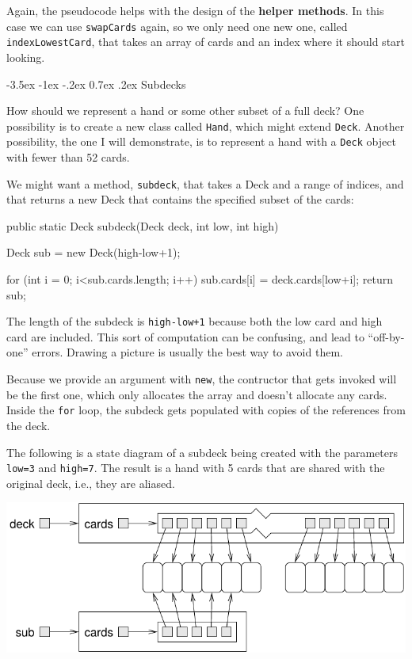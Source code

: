\documentclass[12pt]{book}
\makeatletter
\renewcommand{\section}{\@startsection {section}{1}{\z@}%
    {-3.5ex \@plus -1ex \@minus -.2ex}%
    {0.7ex \@plus.2ex}%
    {\normalfont\Large\bfseries}}
\theoremstyle{exercise}
\newcommand{\java}[1]{\lstinline{#1}} %
\makeatother
\begin{document}
Again, the pseudocode helps with the design of the {\bf helper methods}.
In this case we can use \java{swapCards} again, so we only need one new one, called \java{indexLowestCard}, that takes an array of cards and an index where it should start looking.



\section{Subdecks}

How should we represent a hand or some other subset of a full deck?
One possibility is to create a new class called \java{Hand}, which might extend \java{Deck}.
Another possibility, the one I will demonstrate, is to represent a hand with a \java{Deck} object with fewer than 52 cards.

We might want a method, \java{subdeck}, that takes a Deck and a range of indices, and that returns a new Deck that contains the specified subset of the cards:

\begin{code}
public static Deck subdeck(Deck deck, int low, int high) {
    Deck sub = new Deck(high-low+1);

    for (int i = 0; i<sub.cards.length; i++) {
        sub.cards[i] = deck.cards[low+i];
    }
    return sub;
}
\end{code}

The length of the subdeck is \java{high-low+1} because both the low card and high card are included.
This sort of computation can be confusing, and lead to ``off-by-one'' errors.
Drawing a picture is usually the best way to avoid them.

Because we provide an argument with \java{new}, the contructor that gets invoked will be the first one, which only allocates the array and doesn't allocate any cards.
Inside the \java{for} loop, the subdeck gets populated with copies of the references from the deck.


The following is a state diagram of a subdeck being created with the parameters \java{low=3} and \java{high=7}.
The result is a hand with 5 cards that are shared with the original deck, i.e., they are aliased.

\begin{center}
\includegraphics{figs/subdeck.pdf}
\end{center}
\end{document}
